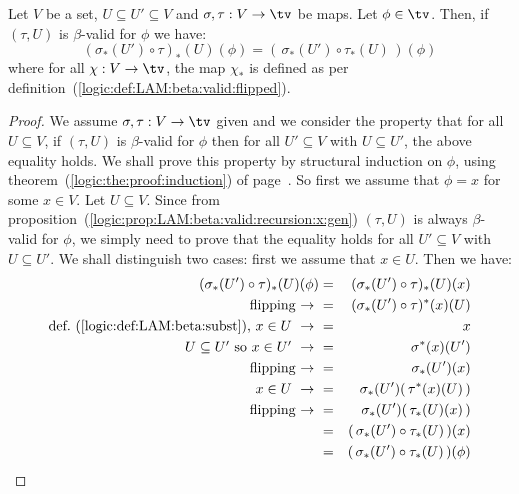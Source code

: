 \begin{prop}\label{logic:prop:LAM:beta:valid:composition:eq:gen}
    Let $V$ be a set, $U\subseteq U' \subseteq V$ and $\sigma,\tau:V\to\tv$ 
    be maps. Let $\phi\in\tv$. Then, if $(\tau,U)$ is $\beta$-valid for $\phi$ 
    we have:
        \[
            (\sigma_{*}(U')\circ\tau)_{*}(U)(\phi)
            =(\,\sigma_{*}(U')\circ\tau_{*}(U)\,)(\phi)
        \]
    where for all $\chi:V\to\tv$, the map $\chi_{*}$ is defined
    as per definition~(\ref{logic:def:LAM:beta:valid:flipped}).
\end{prop}
\begin{proof}
    We assume $\sigma,\tau:V\to\tv$ given and we consider the property
    that for all $U\subseteq V$, if $(\tau, U)$ is $\beta$-valid for $\phi$
    then for all $U'\subseteq V$ with $U\subseteq U'$, the above equality
    holds. We shall prove this property by structural induction on $\phi$, 
    using theorem~(\ref{logic:the:proof:induction})
    of page~\pageref{logic:the:proof:induction}. So first we assume that 
    $\phi=x$ for some $x\in V$. Let $U\subseteq V$. Since from 
    proposition~(\ref{logic:prop:LAM:beta:valid:recursion:x:gen}) $(\tau,U)$ 
    is always $\beta$-valid for $\phi$, we simply need to prove that the 
    equality holds for all $U'\subseteq V$ with $U\subseteq U'$. We shall 
    distinguish two cases: first we assume that $x\in U$. Then we have:
        \begin{eqnarray*}(\sigma_{*}(U')\circ\tau)_{*}(U)(\phi)
            &=&(\sigma_{*}(U')\circ\tau)_{*}(U)(x)\\
            \mbox{flipping\ $\to$\ }
            &=&(\sigma_{*}(U')\circ\tau)^{*}(x)(U)\\
            \mbox{def.~(\ref{logic:def:LAM:beta:subst}), $x\in U\ \to\ $}
            &=&x\\
            \mbox{$U\subseteq U'$ so $x\in U'\ \to\ $}
            &=&\sigma^{*}(x)(U')\\
            \mbox{flipping\ $\to$\ }
            &=&\sigma_{*}(U')(x)\\
            \mbox{$x\in U\ \to\ $}
            &=&\sigma_{*}(U')(\,\tau^{*}(x)(U)\,)\\
            \mbox{flipping\ $\to$\ }
            &=&\sigma_{*}(U')(\,\tau_{*}(U)(x)\,)\\
            &=&(\,\sigma_{*}(U')\circ \tau_{*}(U)\,)(x)\\
            &=&(\,\sigma_{*}(U')\circ \tau_{*}(U)\,)(\phi)
        \end{eqnarray*}

\end{proof}
